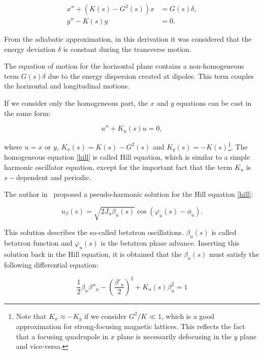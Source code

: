 \begin{align}
    x'' + \left(K(s) - G^{2}(s)\right)x &= G(s) \delta, \\
    y'' - K(s)y &= 0.
\end{align}

From the adiabatic approximation, in this derivation it was considered that the energy deviation $\delta$ is constant during the transverse motion.

The equation of motion for the horizontal plane contains a non-homogeneous term $G(s)\delta$ due to the energy dispersion created at dipoles. This term couples the horizontal and longitudinal motions.

If we consider only the homogeneous part, the $x$ and $y$ equations can be cast in the same form:

\begin{equation}
u'' + K_u(s) u = 0,
\label{hill}
\end{equation}

where $u = x$ or $y$, $K_x(s) = K(s) - G^2(s)$ and $K_y(s) = -K(s)$\footnote{Note that $K_x \approx -K_y$ if we consider $G^2/K \ll 1$, which is a good approximation for strong-focusing magnetic lattices. This reflects the fact that a focusing quadrupole in $x$ plane is necessarily defocusing in the $y$ plane and vice-versa.}. The homogeneous equation \eqref{hill} is called Hill equation, which is similar to a simple harmonic oscillator equation, except for the important fact that the term $K_u$ is $s-$dependent and periodic.

The author in~\cite{CourantSnyder1958} proposed a pseudo-harmonic solution for the Hill equation \eqref{hill}:

\begin{equation}
    u_{\beta}(s) = \sqrt{2 J_u \beta_u (s)} \cos \left(\varphi_u(s) - \phi_u\right).
    \label{eq:beta_oscillation}
\end{equation}

This solution describes the so-called betatron oscillations. $\beta_u(s)$ is called betatron function and $\varphi_u(s)$ is the betatron phase advance. Inserting this solution back in the Hill equation, it is obtained that the $\beta_u(s)$ must satisfy the following differential equation:

\begin{equation}
    \dfrac{1}{2}\beta_u {\beta''_u} -  \left(\dfrac{\beta'_u}{2}\right)^2 + K_u(s) \beta^2_u = 1
    \label{beta_equation}
\end{equation}

